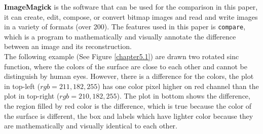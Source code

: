 \documentclass{report}
\begin{document}
\textbf{ImageMagick} \citep{ImageMagick} is the software that can be used for the comparison in this paper, it can create, edit, compose, or convert bitmap images and read and write images in a variety of formats (over 200). The features used in this paper is \texttt{compare}, which is a program to mathematically and visually annotate the difference between an image and its reconstruction.\\

The following example (See Figure \ref{chapter5.1}) are drawn two rotated sinc function, where the colors of the surface are close to each other and cannot be distinguish by human eyes. However, there is a difference for the colors, the plot in top-left ($rgb = 211, 182, 255$) has one color pixel higher on red channel than the plot in top-right ($rgb = 210, 182, 255$). The plot in bottom shows the difference, the region filled by red color is the difference, which is true because the color of the surface is different, the box and labels which have lighter color because they are mathematically and visually identical to each other. \\
\end{document}
